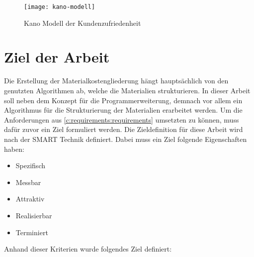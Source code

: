\begin{figure}[h]
	\centering
	\texttt{[image: kano-modell]}
	\caption{Kano Modell der Kundenzufriedenheit}
	\label{fig:kano-model}
\end{figure}

\section{Ziel der Arbeit}
\label{c:intro:target}
Die Erstellung der Materialkostengliederung hängt hauptsächlich von den genutzten Algorithmen ab, welche die Materialien strukturieren. In dieser Arbeit soll neben dem Konzept für die Programmerweiterung, demnach vor allem ein Algorithmus für die Strukturierung der Materialien erarbeitet werden. 
Um die Anforderungen aus \autoref{c:requirements:requirements} umsetzten zu können, muss dafür zuvor ein Ziel formuliert werden. Die Zieldefinition für diese Arbeit wird nach der SMART Technik definiert. Dabei muss ein Ziel folgende Eigenschaften haben:
\begin{itemize}
	\setlength\itemsep{0.01em}
	\item Spezifisch
	\item Messbar
	\item Attraktiv
	\item Realisierbar
	\item Terminiert
\end{itemize}

Anhand dieser Kriterien wurde folgendes Ziel definiert: 


